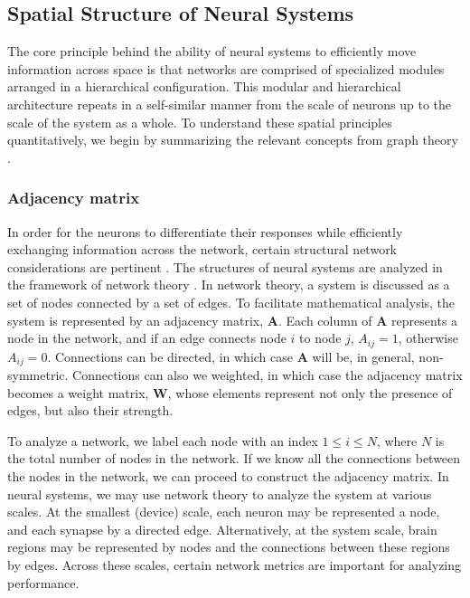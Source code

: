 \subsection{Spatial Structure of Neural Systems}
The core principle behind the ability of neural systems to efficiently move information across space is that networks are comprised of specialized modules arranged in a hierarchical configuration. This modular and hierarchical architecture repeats in a self-similar manner from the scale of neurons up to the scale of the system as a whole. To understand these spatial principles quantitatively, we begin by summarizing the relevant concepts from graph theory \cite{eskn2015}.

\subsubsection{Adjacency matrix}
In order for the neurons to differentiate their responses while efficiently exchanging information across the network, certain structural network considerations are pertinent \cite{rusp2010}. The structures of neural systems are analyzed in the framework of network theory \cite{eskn2015}. In network theory, a system is discussed as a set of nodes connected by a set of edges. To facilitate mathematical analysis, the system is represented by an adjacency matrix, $\mathbf{A}$. Each column of $\mathbf{A}$ represents a node in the network, and if an edge connects node $i$ to node $j$, $A_{ij} = 1$, otherwise $A_{ij} = 0$. Connections can be directed, in which case $\mathbf{A}$ will be, in general, non-symmetric. Connections can also we weighted, in which case the adjacency matrix becomes a weight matrix, $\mathbf{W}$, whose elements represent not only the presence of edges, but also their strength.

To analyze a network, we label each node with an index $1\le i\le N$, where $N$ is the total number of nodes in the network. If we know all the connections between the nodes in the network, we can proceed to construct the adjacency matrix. In neural systems, we may use network theory to analyze the system at various scales. At the smallest (device) scale, each neuron may be represented a node, and each synapse by a directed edge. Alternatively, at the system scale, brain regions may be represented by nodes and the connections between these regions by edges. Across these scales, certain network metrics are important for analyzing performance. 

